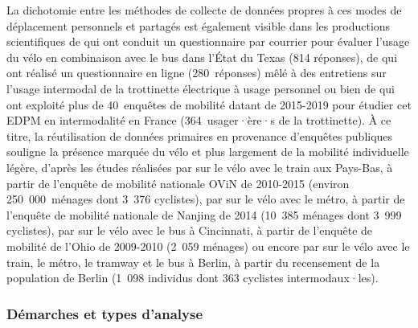 \begin{refsegment}
La dichotomie entre les méthodes de collecte de données propres à ces modes de déplacement personnels et partagés est également visible dans les productions scientifiques de \textcolor{blue}{\textcite[87]{taylor_analysis_1996}} qui ont conduit un questionnaire par courrier pour évaluer l'usage du vélo en combinaison avec le bus dans l'État du Texas (814 réponses), de \textcolor{blue}{\textcite[10]{pages_nouveaux_2021}} qui ont réalisé un questionnaire en ligne (280~réponses) mêlé à des entretiens sur l'usage intermodal de la trottinette électrique à usage personnel ou bien de \textcolor{blue}{\textcite[60]{rabaud_quand_2022}} qui ont exploité plus de 40~enquêtes de mobilité datant de 2015-2019 pour étudier cet \acrfull{EDPM} en intermodalité en France (364~usager·ère·s de la trottinette). À ce titre, la réutilisation de données primaires en provenance d'enquêtes publiques souligne la présence marquée du vélo et plus largement de la mobilité individuelle légère, d'après les études réalisées par \textcolor{blue}{\textcite[8-10]{shelat_analysing_2018}} sur le vélo avec le train aux Pays-Bas, à partir de l'enquête de mobilité nationale \acrfull{OViN} de 2010-2015 (environ 250~000~ménages dont 3~376 cyclistes), par \textcolor{blue}{\textcite[9]{luan_better_2020}} sur le vélo avec le métro, à partir de l'enquête de mobilité nationale de Nanjing de 2014 (10~385 ménages dont 3~999 cyclistes), par \textcolor{blue}{\textcite[3]{zuo_determining_2018}} sur le vélo avec le bus à Cincinnati, à partir de l'enquête de mobilité de l'Ohio de 2009-2010 (2~059 ménages) ou encore par \textcolor{blue}{\textcite[76]{oostendorp_combining_2018}} sur le vélo avec le train, le métro, le tramway et le bus à Berlin, à partir du recensement de la population de Berlin (1~098 individus dont 363 cyclistes intermodaux·les).%

\subsubsection*{Démarches et types d'analyse
    \label{chap2:demarches-types-analyses}
    }
    

\end{refsegment}

